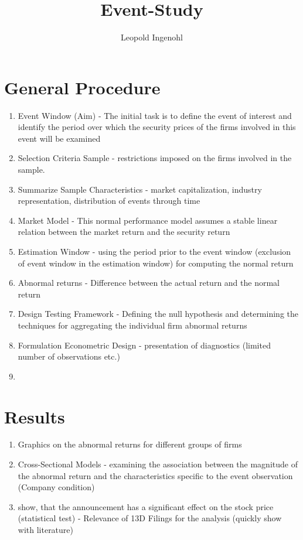\documentclass[12pt]{article}
\title{Event-Study}
\author{Leopold Ingenohl}
\begin{document}
\maketitle

\section{General Procedure}


\begin{enumerate}
	\item Event Window (Aim) - The initial task is to define the event of interest and identify the period over which the security prices of the firms involved in this event will be examined
	\item Selection Criteria Sample - restrictions imposed on the firms involved in the sample.
	\item Summarize Sample Characteristics - market capitalization, industry representation, distribution of events through time
	\item Market Model - This normal performance model assumes a stable linear relation between the market return and the security return
	\item Estimation Window - using the period prior to the event window (exclusion of event window in the estimation window) for computing the normal return
	\item Abnormal returns - Difference between the actual return and the normal return 
	\item Design Testing Framework - Defining the null hypothesis and determining the techniques for aggregating the individual firm abnormal returns
	\item Formulation Econometric Design - presentation of diagnostics (limited number of observations etc.)
	\item 
\end{enumerate}

\section{Results}

\begin{enumerate}
	\item Graphics on the abnormal returns for different groups of firms 
	\item Cross-Sectional Models - examining the association between the magnitude of the abnormal return and the characteristics specific to the event observation (Company condition)
	\item show, that the announcement has a significant effect on the stock price (statistical test) - Relevance of 13D Filings for the analysis (quickly show with literature)
\end{enumerate}
\end{document}
